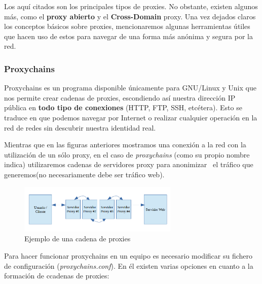 Los aquí citados son los principales tipos de proxies. No obstante, existen algunos más, como el \textbf{proxy abierto} y el \textbf{Cross-Domain }proxy.
Una vez dejados claros los conceptos básicos sobre proxies, mencionaremos algunas herramientas útiles que hacen uso de estos para navegar de una forma más anónima y segura por la red.

\subsubsection{Proxychains}

Proxychains es un programa disponible únicamente para GNU/Linux y Unix que nos permite crear cadenas de proxies, escondiendo así nuestra dirección IP pública en \textbf{todo tipo de conexiones} (HTTP, FTP, SSH, etcétera). 
Esto se traduce en que podemos navegar por Internet o realizar cualquier operación en la red de redes sin descubrir nuestra identidad real.

Mientras que en las figuras anteriores mostramos una conexión a la red con la utilización de un sólo proxy, en el caso de \textit{proxychains} (como su propio nombre indica) utilizaremos cadenas de servidores proxy para anonimizar~\cite{article:proxychains} el tráfico que generemos(no necesariamente debe ser tráfico web).

\begin{figure}[h]
	\centerline{
		\mbox{\includegraphics[width=3.00in]{images/proxy_chain.png}}
	}
	\caption{Ejemplo de una cadena de proxies}
	\label{fig:proxy_chain}
\end{figure}

Para hacer funcionar proxychains en un equipo es necesario modificar su fichero de configuración (\textit{proxychains.conf}). En él existen varias opciones en cuanto a la formación de ccadenas de proxies:


